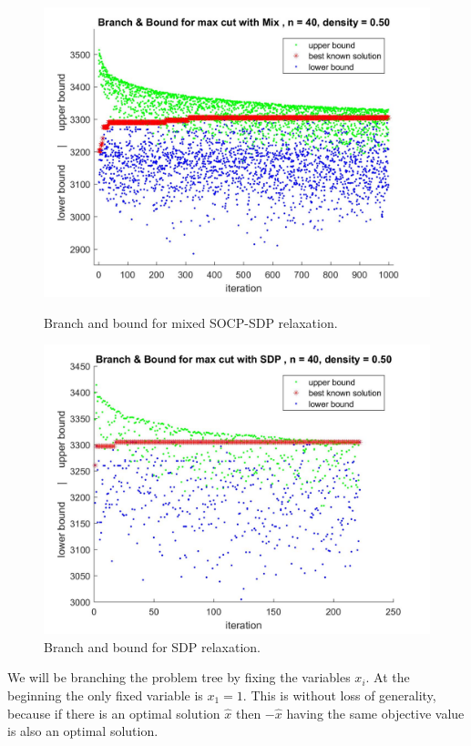 \documentclass[12pt]{book}
\theoremstyle{definition}
\begin{document}
\begin{figure}
\centering 

\includegraphics[scale=0.27]{img/bnb_mix_n40_d50_1.jpg}
\caption[Branch and bound for mixed SOCP-SDP relaxation]{Branch and bound for mixed SOCP-SDP relaxation. }
\label{FigureBnb1mix}

\includegraphics[scale=0.27]{img/bnb_sdp_n40_d50_1.jpg}
\caption[Branch and bound for SDP relaxation]{Branch and bound for SDP relaxation. }
\label{Figurebnb1sdp}
\end{figure}


We will be branching the problem tree by fixing the variables $x_i$.
At the beginning the only fixed variable is $x_1=1$. This is without loss of generality, because if there is an optimal solution $\hat{x}$ then $-\hat{x}$ having the same objective value is also an optimal solution. 
\end{document}
